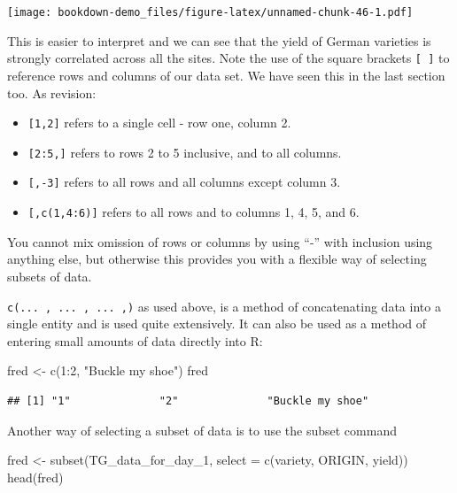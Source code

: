 \documentclass[
]{book}
\newenvironment{Shaded}{\begin{snugshade}}{\end{snugshade}}
\newcommand{\AttributeTok}[1]{\textcolor[rgb]{0.77,0.63,0.00}{#1}}
\newcommand{\DecValTok}[1]{\textcolor[rgb]{0.00,0.00,0.81}{#1}}
\newcommand{\FunctionTok}[1]{\textcolor[rgb]{0.00,0.00,0.00}{#1}}
\newcommand{\NormalTok}[1]{#1}
\newcommand{\OtherTok}[1]{\textcolor[rgb]{0.56,0.35,0.01}{#1}}
\newcommand{\SpecialCharTok}[1]{\textcolor[rgb]{0.00,0.00,0.00}{#1}}
\newcommand{\StringTok}[1]{\textcolor[rgb]{0.31,0.60,0.02}{#1}}
\providecommand{\tightlist}{%
  \setlength{\itemsep}{0pt}\setlength{\parskip}{0pt}}
\begin{document}
\texttt{[image: bookdown-demo\_files/figure-latex/unnamed-chunk-46-1.pdf]}

This is easier to interpret and we can see that the yield of German varieties is strongly correlated across all the sites. Note the use of the square brackets \texttt{{[}\ {]}} to reference rows and columns of our data set. We have seen this in the last section too. As revision:

\begin{itemize}
\tightlist
\item
  \texttt{{[}1,2{]}} refers to a single cell - row one, column 2.
\item
  \texttt{{[}2:5,{]}} refers to rows 2 to 5 inclusive, and to all columns.
\item
  \texttt{{[},-3{]}} refers to all rows and all columns except column 3.
\item
  \texttt{{[},c(1,4:6){]}} refers to all rows and to columns 1, 4, 5, and 6.
\end{itemize}

You cannot mix omission of rows or columns by using ``-'' with inclusion using anything else, but otherwise this provides you with a flexible way of selecting subsets of data.

\texttt{c(...\ ,\ ...\ ,\ ...\ ,)} as used above, is a method of concatenating data into a single entity and is used quite extensively. It can also be used as a method of entering small amounts of data directly into R:

\begin{Shaded}
\begin{Highlighting}[]
\NormalTok{fred }\OtherTok{\textless{}{-}} \FunctionTok{c}\NormalTok{(}\DecValTok{1}\SpecialCharTok{:}\DecValTok{2}\NormalTok{, }\StringTok{"Buckle my shoe"}\NormalTok{)}
\NormalTok{fred}
\end{Highlighting}
\end{Shaded}

\begin{verbatim}
## [1] "1"              "2"              "Buckle my shoe"
\end{verbatim}

Another way of selecting a subset of data is to use the subset command

\begin{Shaded}
\begin{Highlighting}[]
\NormalTok{fred }\OtherTok{\textless{}{-}} \FunctionTok{subset}\NormalTok{(TG\_data\_for\_day\_1, }\AttributeTok{select =} \FunctionTok{c}\NormalTok{(variety, ORIGIN, }
\NormalTok{    yield))}
\FunctionTok{head}\NormalTok{(fred)}
\end{Highlighting}
\end{Shaded}
\end{document}
